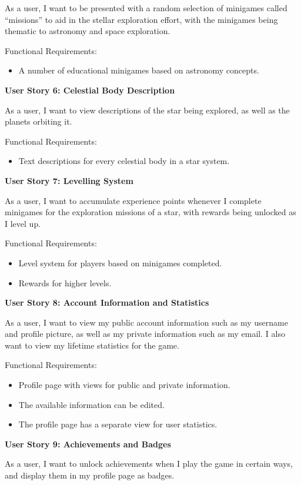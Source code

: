 As a user, I want to be presented with a random selection of minigames called “missions” to aid in the stellar exploration effort, with the minigames being thematic to astronomy and space exploration.

Functional Requirements:
\begin{itemize}
\item A number of educational minigames based on astronomy concepts.
\end{itemize}

\textbf{User Story 6: Celestial Body Description}

As a user, I want to view descriptions of the star being explored, as well as the planets orbiting it.

Functional Requirements:
\begin{itemize}
\item Text descriptions for every celestial body in a star system.
\end{itemize}

\textbf{User Story 7: Levelling System}

As a user, I want to accumulate experience points whenever I complete minigames for the exploration missions of a star, with rewards being unlocked as I level up.

Functional Requirements:
\begin{itemize}
\item Level system for players based on minigames completed.
\item Rewards for higher levels.
\end{itemize}

\textbf{User Story 8: Account Information and Statistics}

As a user, I want to view my public account information such as my username and profile picture, as well as my private information such as my email. I also want to view my lifetime statistics for the game.

Functional Requirements:
\begin{itemize}
\item Profile page with views for public and private information.
\item The available information can be edited.
\item The profile page has a separate view for user statistics.
\end{itemize}

\textbf{User Story 9: Achievements and Badges}

As a user, I want to unlock achievements when I play the game in certain ways, and display them in my profile page as badges.

